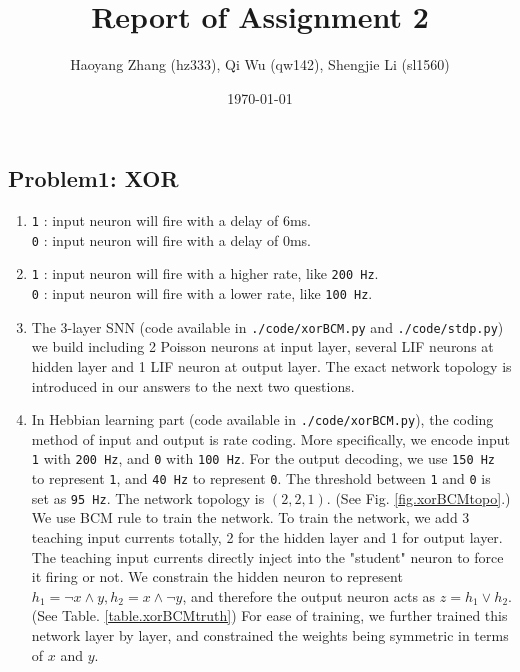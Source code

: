 \documentclass[11pt]{article}
\title{Report of Assignment 2}
\author{Haoyang Zhang (hz333), Qi Wu (qw142), Shengjie Li (sl1560)}
\begin{document}
\date{\today}
\maketitle

\subsection*{Problem1: XOR}
\begin{enumerate}
	\item 
	\texttt{1} : input neuron will fire with a delay of 6ms. \\
	\texttt{0} : input neuron will fire with a delay of 0ms.
	\item
	\texttt{1} : input neuron will fire with a higher rate, like \texttt{200 Hz}.\\
	\texttt{0} : input neuron will fire with a lower rate, like \texttt{100 Hz}.
	\item
	The 3-layer SNN (code available in \texttt{./code/xorBCM.py} and \texttt{./code/stdp.py}) we build including 2 Poisson neurons at input layer, several LIF neurons at hidden layer and 1 LIF neuron at output layer. The exact network topology is introduced in our answers to the next two questions.
	\item
	In Hebbian learning part (code available in \texttt{./code/xorBCM.py}), the coding method of input and output is rate coding. More specifically, we encode input \texttt{1} with \texttt{200 Hz}, and \texttt{0} with \texttt{100 Hz}. For the output decoding, we use \texttt{150 Hz} to represent \texttt{1}, and \texttt{40 Hz} to represent \texttt{0}. The threshold between \texttt{1} and \texttt{0} is set as \texttt{95 Hz}. The network topology is $(2, 2, 1)$. (See Fig. \ref{fig.xorBCMtopo}.) We use BCM rule to train the network. To train the network, we add 3 teaching input currents totally, 2 for the hidden layer and 1 for output layer. The teaching input currents directly inject into the "student" neuron to force it firing or not. We constrain the hidden neuron to represent $h_1 = \lnot x \land y, h_2 = x \land \lnot y$, and therefore the output neuron acts as $z = h_1 \lor h_2$. (See Table. \ref{table.xorBCMtruth}) For ease of training, we further trained this network layer by layer, and constrained the weights being symmetric in terms of $x$ and $y$.
	\begin{figure}[htbp]
	\centering

        \begin{tikzpicture}[x=0.75pt,y=0.75pt,yscale=-1,xscale=1]


\end{tikzpicture}
\end{figure}
\end{enumerate}
\end{document}
